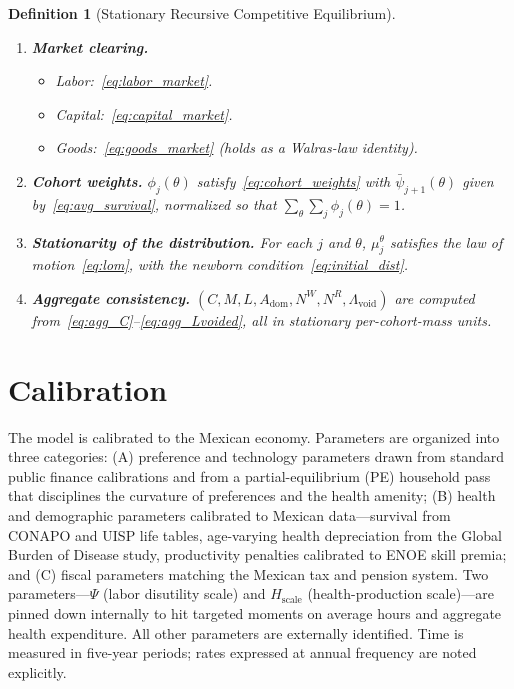 \documentclass[12pt,a4paper]{article}
\newtheorem{definition}{Definition}
\begin{document}
\begin{definition}[Stationary Recursive Competitive Equilibrium]
\begin{enumerate}
\item \textbf{Market clearing.}
\begin{itemize}
\item Labor:~\eqref{eq:labor_market}.
\item Capital:~\eqref{eq:capital_market}.
\item Goods:~\eqref{eq:goods_market} (holds as a Walras-law identity).
\end{itemize}
\item \textbf{Cohort weights.} $\phi_j(\theta)$ satisfy~\eqref{eq:cohort_weights} with $\bar\psi_{j+1}(\theta)$ given by~\eqref{eq:avg_survival}, normalized so that $\sum_\theta \sum_j \phi_j(\theta) = 1$.
\item \textbf{Stationarity of the distribution.} For each $j$ and $\theta$, $\mu_j^\theta$ satisfies the law of motion~\eqref{eq:lom}, with the newborn condition~\eqref{eq:initial_dist}.
\item \textbf{Aggregate consistency.} $(C, M, L, A_{\mathrm{dom}}, N^W, N^R, \Lambda_{\mathrm{void}})$ are computed from~\eqref{eq:agg_C}--\eqref{eq:agg_Lvoided}, all in stationary per-cohort-mass units.
\end{enumerate}
\end{definition}


\section{Calibration}
\label{sec:calibration}

The model is calibrated to the Mexican economy. Parameters are organized
into three categories: (A) preference and technology parameters drawn
from standard public finance calibrations and from a partial-equilibrium
(PE) household pass that disciplines the curvature of preferences and
the health amenity; (B) health and demographic parameters calibrated to
Mexican data---survival from CONAPO and UISP life tables, age-varying
health depreciation from the Global Burden of Disease study, productivity
penalties calibrated to ENOE skill premia; and (C) fiscal parameters
matching the Mexican tax and pension system. Two parameters---$\Psi$
(labor disutility scale) and $H_{\text{scale}}$ (health-production
scale)---are pinned down internally to hit targeted moments on average
hours and aggregate health expenditure. All other parameters are
externally identified. Time is measured in five-year periods; rates
expressed at annual frequency are noted explicitly.
\end{document}
